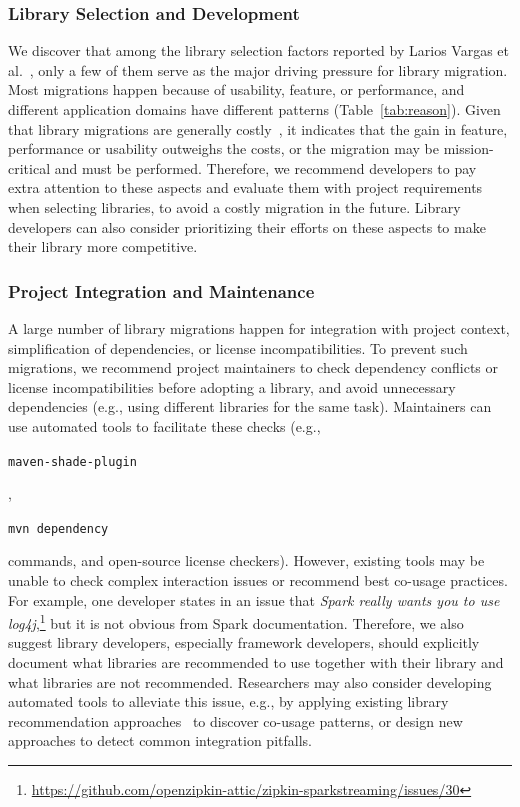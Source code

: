 \documentclass[sigconf, screen]{acmart}
\newcommand{\Code}[1]{\begin{small}\texttt{#1}\end{small}}
\begin{document}
\subsubsection{Library Selection and Development}

We discover that among the library selection factors reported by Larios Vargas et al.~\cite{larios2020selecting}, only a few of them serve as the major driving pressure for library migration.
Most migrations happen because of usability, feature, or performance, and different application domains have different patterns (Table~\ref{tab:reason}).
Given that library migrations are generally costly~\cite{alrubaye2019use, chen2019mining}, it indicates that the gain in feature, performance or usability outweighs the costs, or the migration may be mission-critical and must be performed.
Therefore, we recommend developers to pay extra attention to these aspects and evaluate them with project requirements when selecting libraries, to avoid a costly migration in the future.
Library developers can also consider prioritizing their efforts on these aspects to make their library more competitive.

\subsubsection{Project Integration and Maintenance}

A large number of library migrations happen for integration with project context, simplification of dependencies, or license incompatibilities.
To prevent such migrations, we recommend project maintainers to check dependency conflicts or license incompatibilities before adopting a library, and avoid unnecessary dependencies (e.g., using different libraries for the same task).
Maintainers can use automated tools to facilitate these checks (e.g., \Code{maven-shade-plugin}, \Code{mvn dependency} commands, and open-source license checkers).
However, existing tools may be unable to check complex interaction issues or recommend best co-usage practices.
For example, one developer states in an issue that \textit{Spark really wants you to use log4j},\footnote{\url{https://github.com/openzipkin-attic/zipkin-sparkstreaming/issues/30}} but it is not obvious from Spark documentation.
Therefore, we also suggest library developers, especially framework developers, should explicitly document what libraries are recommended to use together with their library and what libraries are not recommended.
Researchers may also consider developing automated tools to alleviate this issue, e.g., by applying existing library recommendation approaches~\cite{thung2013automated, saied2018improving, nguyen2020crossrec} to discover co-usage patterns, or design new approaches to detect common integration pitfalls.
\end{document}
